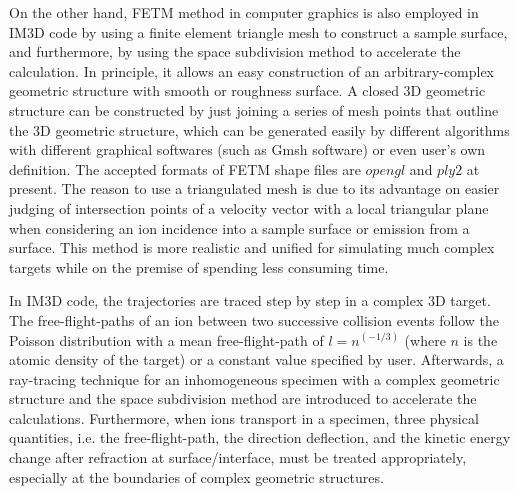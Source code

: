 On the other hand, FETM method\cite{Li:2008,Zhang:2011} in computer graphics is also employed in IM3D code by using a finite element triangle mesh to construct a sample surface, and furthermore, by using the space subdivision method to accelerate the calculation. In principle, it allows an easy construction of an arbitrary-complex geometric structure with smooth or roughness surface. A closed 3D geometric structure can be constructed by just joining a series of mesh points that outline the 3D geometric structure, which can be generated easily by different algorithms with different graphical softwares (such as Gmsh software\cite{Geuzaine:2009}) or even user's own definition. The accepted formats of FETM shape files are $opengl$ and $ply2$ at present. The reason to use a triangulated mesh is due to its advantage on easier judging of intersection points of a velocity vector with a local triangular plane when considering an ion incidence into a sample surface or emission from a surface. This method is more realistic and unified for simulating much complex targets while on the premise of spending less consuming time.

In IM3D code, the trajectories are traced step by step in a complex 3D target. The free-flight-paths of an ion between two successive collision events follow the Poisson distribution with a mean free-flight-path of $l = n^{(-1/3)}$ (where $n$ is the atomic density of the target) or a constant value specified by user. Afterwards, a ray-tracing technique\cite{Li:2005,Li:2009} for an inhomogeneous specimen with a complex geometric structure and the space subdivision method are introduced to accelerate the calculations\cite{Li:2008,Zhang:2011}. Furthermore, when ions transport in a specimen, three physical quantities, i.e. the free-flight-path, the direction deflection, and the kinetic energy change after refraction at surface/interface, must be treated appropriately, especially at the boundaries of complex geometric structures\cite{Li:2008}.
